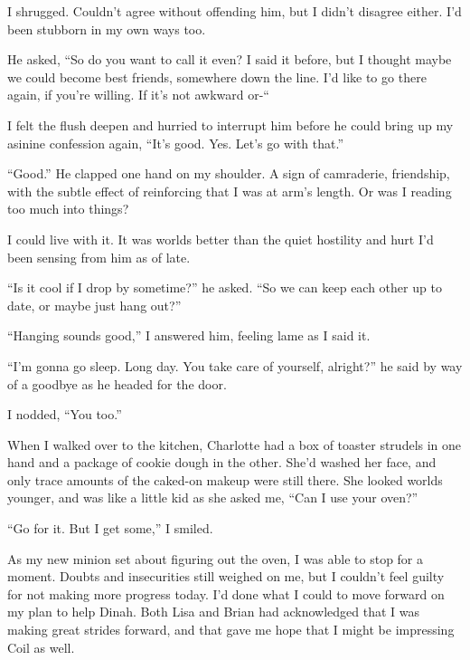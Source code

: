 I shrugged.  Couldn't agree without offending him, but I didn't disagree either.   I'd been stubborn in my own ways too.



He asked, ``So do you want to call it even?  I said it before, but I thought maybe we could become best friends, somewhere down the line.  I'd like to go there again, if you're willing.  If it's not awkward or-``



I felt the flush deepen and hurried to interrupt him before he could bring up my asinine confession again, ``It's good.  Yes.  Let's go with that.''



``Good.''  He clapped one hand on my shoulder.  A sign of camraderie, friendship, with the subtle effect of reinforcing that I was at arm's length.  Or was I reading too much into things?



I could live with it.  It was worlds better than the quiet hostility and hurt I'd been sensing from him as of late.



``Is it cool if I drop by sometime?'' he asked.  ``So we can keep each other up to date, or maybe just hang out?''



``Hanging sounds good,'' I answered him, feeling lame as I said it.



``I'm gonna go sleep.  Long day.  You take care of yourself, alright?'' he said by way of a goodbye as he headed for the door.



I nodded, ``You too.''



When I walked over to the kitchen, Charlotte had a box of toaster strudels in one hand and a package of cookie dough in the other.  She'd washed her face, and only trace amounts of the caked-on makeup were still there.  She looked worlds younger, and was like a little kid as she asked me, ``Can I use your oven?''



``Go for it.  But I get some,'' I smiled.



As my new minion set about figuring out the oven, I was able to stop for a moment.  Doubts and insecurities still weighed on me, but I couldn't feel guilty for not making more progress today.  I'd done what I could to move forward on my plan to help Dinah.  Both Lisa and Brian had acknowledged that I was making great strides forward, and that gave me hope that I might be impressing Coil as well.



